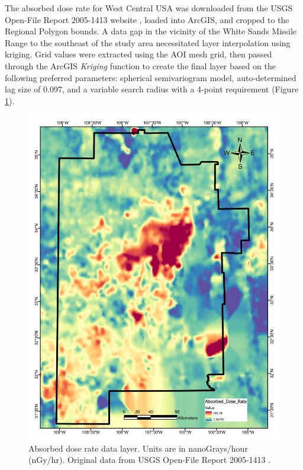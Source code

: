 The absorbed dose rate for West Central USA was downloaded from the USGS Open-File Report 2005-1413 website \citep{duval_terrestrial_2005}, loaded into ArcGIS, and cropped to the Regional Polygon bounds. A data gap in the vicinity of the White Sands Missile Range to the southeast of the study area necessitated layer interpolation using kriging. Grid values were extracted using the AOI mesh grid, then passed through the ArcGIS \textit{Kriging} function to create the final layer based on the following preferred parameters: spherical semivariogram model, auto-determined lag size of 0.097, and a variable search radius with a 4-point requirement (Figure \ref{fig:feat_gamma}).
\vfill
\pagebreak

\begin{figure}[H]
\centering
\includegraphics[width=0.75\linewidth]{templates/images/Figure-AbsorbedDose.pdf}
\caption[Absorbed dose rate data layer]{Absorbed dose rate data layer. Units are in nanoGrays/hour (nGy/hr). Original data from USGS Open-File Report 2005-1413 \protect\citep{duval_terrestrial_2005}.}
\label{fig:feat_gamma}
\end{figure}
\pagebreak

